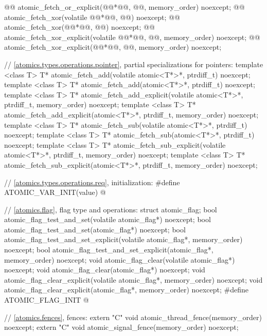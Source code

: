 \begin{codeblock}
{  @@ atomic_fetch_or_explicit(@@*@\itcorr[-1]@, @@, memory_order) noexcept;
  @@ atomic_fetch_xor(volatile @@*@\itcorr[-1]@, @@) noexcept;
  @@ atomic_fetch_xor(@@*@\itcorr[-1]@, @@) noexcept;
  @@ atomic_fetch_xor_explicit(volatile @@*@\itcorr[-1]@, @@, memory_order) noexcept;
  @@ atomic_fetch_xor_explicit(@@*@\itcorr[-1]@, @@, memory_order) noexcept;

  // \ref{atomics.types.operations.pointer}, partial specializations for pointers:
  template <class T>
    T* atomic_fetch_add(volatile atomic<T*>*, ptrdiff_t) noexcept;
  template <class T>
    T* atomic_fetch_add(atomic<T*>*, ptrdiff_t) noexcept;
  template <class T>
    T* atomic_fetch_add_explicit(volatile atomic<T*>*, ptrdiff_t, memory_order) noexcept;
  template <class T>
    T* atomic_fetch_add_explicit(atomic<T*>*, ptrdiff_t, memory_order) noexcept;
  template <class T>
    T* atomic_fetch_sub(volatile atomic<T*>*, ptrdiff_t) noexcept;
  template <class T>
    T* atomic_fetch_sub(atomic<T*>*, ptrdiff_t) noexcept;
  template <class T>
    T* atomic_fetch_sub_explicit(volatile atomic<T*>*, ptrdiff_t, memory_order) noexcept;
  template <class T>
    T* atomic_fetch_sub_explicit(atomic<T*>*, ptrdiff_t, memory_order) noexcept;

  // \ref{atomics.types.operations.req}, initialization:
  #define ATOMIC_VAR_INIT(value) @\seebelow@

  // \ref{atomics.flag}, flag type and operations:
  struct atomic_flag;
  bool atomic_flag_test_and_set(volatile atomic_flag*) noexcept;
  bool atomic_flag_test_and_set(atomic_flag*) noexcept;
  bool atomic_flag_test_and_set_explicit(volatile atomic_flag*, memory_order) noexcept;
  bool atomic_flag_test_and_set_explicit(atomic_flag*, memory_order) noexcept;
  void atomic_flag_clear(volatile atomic_flag*) noexcept;
  void atomic_flag_clear(atomic_flag*) noexcept;
  void atomic_flag_clear_explicit(volatile atomic_flag*, memory_order) noexcept;
  void atomic_flag_clear_explicit(atomic_flag*, memory_order) noexcept;
  #define ATOMIC_FLAG_INIT @\seebelow@

  // \ref{atomics.fences}, fences:
  extern "C" void atomic_thread_fence(memory_order) noexcept;
  extern "C" void atomic_signal_fence(memory_order) noexcept;
}
\end{codeblock}

